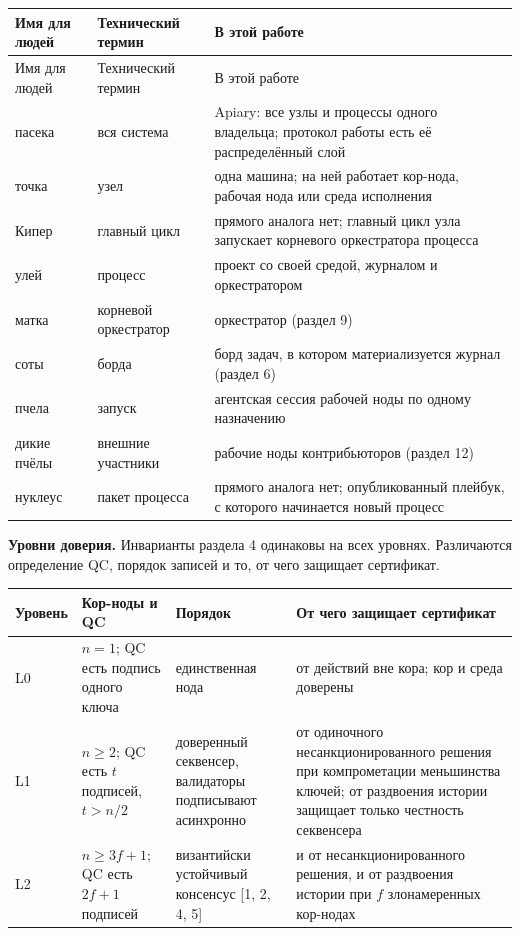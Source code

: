 \documentclass[11pt,a4paper]{article}
\begin{document}
{\footnotesize
\begin{longtable}{p{2.1cm} p{3.1cm} p{8.0cm}}
\toprule
Имя для людей & Технический термин & В этой работе \\
\midrule
\endfirsthead
\toprule
Имя для людей & Технический термин & В этой работе \\
\midrule
\endhead
\bottomrule
\endfoot
\bottomrule
\endlastfoot
пасека & вся система & Apiary: все узлы и процессы одного владельца; протокол работы есть её распределённый слой \\
точка & узел & одна машина; на ней работает кор-нода, рабочая нода или среда исполнения \\
Кипер & главный цикл & прямого аналога нет; главный цикл узла запускает корневого оркестратора процесса \\
улей & процесс & проект со своей средой, журналом и оркестратором \\
матка & корневой оркестратор & оркестратор (раздел 9) \\
соты & борда & борд задач, в котором материализуется журнал (раздел 6) \\
пчела & запуск & агентская сессия рабочей ноды по одному назначению \\
дикие пчёлы & внешние участники & рабочие ноды контрибьюторов (раздел 12) \\
нуклеус & пакет процесса & прямого аналога нет; опубликованный плейбук, с которого начинается новый процесс \\
\end{longtable}
}

\textbf{Уровни доверия.} Инварианты раздела 4 одинаковы на всех уровнях. Различаются определение QC, порядок записей и то, от чего защищает сертификат.

\begin{center}
\footnotesize
\begin{tabular}{p{1.1cm} p{3.4cm} p{3.0cm} p{5.6cm}}
\toprule
Уровень & Кор-ноды и QC & Порядок & От чего защищает сертификат \\
\midrule
L0 & $n = 1$; QC есть подпись одного ключа & единственная нода & от действий вне кора; кор и среда доверены \\
L1 & $n \geq 2$; QC есть $t$ подписей, $t > n/2$ & доверенный секвенсер, валидаторы подписывают асинхронно & от одиночного несанкционированного решения при компрометации меньшинства ключей; от раздвоения истории защищает только честность секвенсера \\
L2 & $n \geq 3f+1$; QC есть $2f+1$ подписей & византийски устойчивый консенсус [1, 2, 4, 5] & и от несанкционированного решения, и от раздвоения истории при $f$ злонамеренных кор-нодах \\
\bottomrule
\end{tabular}
\end{center}
\end{document}
